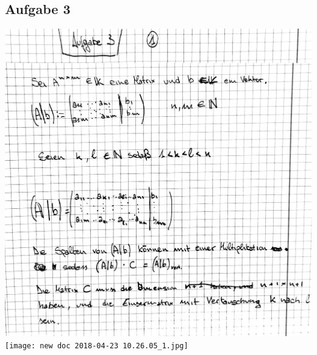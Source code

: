 \documentclass[10pt,a4paper]{article}
\begin{document}
\subsection{Aufgabe 3}
	\includegraphics[scale=0.3]{LA_T2_LSG_3.jpg} 
	\newpage
	\texttt{[image: new doc 2018-04-23 10.26.05\_1.jpg]} 
	\newpage
\end{document}
